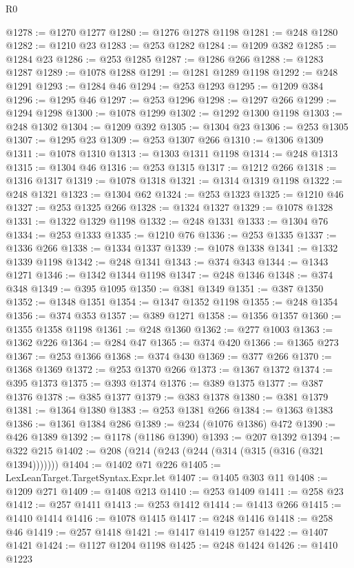\begin{lexlean}{R0}
\begin{coremodule}
@1278 := @1270 @1277
@1280 := @1276 @1278 @1198
@1281 := @248 @1280
@1282 := @1210 @23
@1283 := @253 @1282
@1284 := @1209 @382
@1285 := @1284 @23
@1286 := @253 @1285
@1287 := @1286 @266
@1288 := @1283 @1287
@1289 := @1078 @1288
@1291 := @1281 @1289 @1198
@1292 := @248 @1291
@1293 := @1284 @46
@1294 := @253 @1293
@1295 := @1209 @384
@1296 := @1295 @46
@1297 := @253 @1296
@1298 := @1297 @266
@1299 := @1294 @1298
@1300 := @1078 @1299
@1302 := @1292 @1300 @1198
@1303 := @248 @1302
@1304 := @1209 @392
@1305 := @1304 @23
@1306 := @253 @1305
@1307 := @1295 @23
@1309 := @253 @1307 @266
@1310 := @1306 @1309
@1311 := @1078 @1310
@1313 := @1303 @1311 @1198
@1314 := @248 @1313
@1315 := @1304 @46
@1316 := @253 @1315
@1317 := @1212 @266
@1318 := @1316 @1317
@1319 := @1078 @1318
@1321 := @1314 @1319 @1198
@1322 := @248 @1321
@1323 := @1304 @62
@1324 := @253 @1323
@1325 := @1210 @46
@1327 := @253 @1325 @266
@1328 := @1324 @1327
@1329 := @1078 @1328
@1331 := @1322 @1329 @1198
@1332 := @248 @1331
@1333 := @1304 @76
@1334 := @253 @1333
@1335 := @1210 @76
@1336 := @253 @1335
@1337 := @1336 @266
@1338 := @1334 @1337
@1339 := @1078 @1338
@1341 := @1332 @1339 @1198
@1342 := @248 @1341
@1343 := @374 @343
@1344 := @1343 @1271
@1346 := @1342 @1344 @1198
@1347 := @248 @1346
@1348 := @374 @348
@1349 := @395 @1095
@1350 := @381 @1349
@1351 := @387 @1350
@1352 := @1348 @1351
@1354 := @1347 @1352 @1198
@1355 := @248 @1354
@1356 := @374 @353
@1357 := @389 @1271
@1358 := @1356 @1357
@1360 := @1355 @1358 @1198
@1361 := @248 @1360
@1362 := @277 @1003
@1363 := @1362 @226
@1364 := @284 @47
@1365 := @374 @420
@1366 := @1365 @273
@1367 := @253 @1366
@1368 := @374 @430
@1369 := @377 @266
@1370 := @1368 @1369
@1372 := @253 @1370 @266
@1373 := @1367 @1372
@1374 := @395 @1373
@1375 := @393 @1374
@1376 := @389 @1375
@1377 := @387 @1376
@1378 := @385 @1377
@1379 := @383 @1378
@1380 := @381 @1379
@1381 := @1364 @1380
@1383 := @253 @1381 @266
@1384 := @1363 @1383
@1386 := @1361 @1384 @286
@1389 := @234 (@1076 @1386) @472
@1390 := @426 @1389
@1392 := @1178 (@1186 @1390)
@1393 := @207 @1392
@1394 := @322 @215
@1402 := @208 (@214 (@243 (@244 (@314 (@315 (@316 (@321 @1394)))))))
@1404 := @1402 @71 @226
@1405 := LexLeanTarget.TargetSyntax.Expr.let
@1407 := @1405 @303 @11
@1408 := @1209 @271
@1409 := @1408 @213
@1410 := @253 @1409
@1411 := @258 @23
@1412 := @257 @1411
@1413 := @253 @1412
@1414 := @1413 @266
@1415 := @1410 @1414
@1416 := @1078 @1415
@1417 := @248 @1416
@1418 := @258 @46
@1419 := @257 @1418
@1421 := @1417 @1419 @1257
@1422 := @1407 @1421
@1424 := @1127 @1204 @1198
@1425 := @248 @1424
@1426 := @1410 @1223

\end{coremodule}
\end{lexlean}
